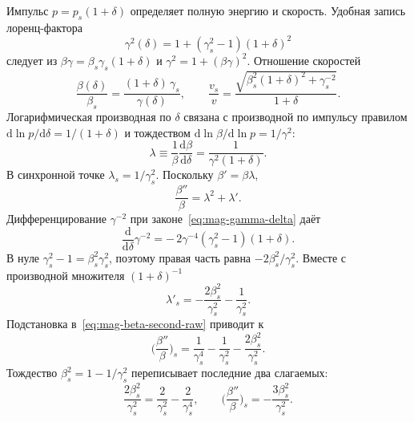 \documentclass[aps,pra,preprint,a4paper,amsmath,amssymb,longbibliography]{revtex4-2}
\begin{document}
Импульс $p=p_s(1+\delta)$ определяет полную энергию и скорость. Удобная запись лоренц-фактора
\begin{equation}
\label{eq:mag-gamma-delta}
\gamma^2(\delta)=1+(\gamma_s^2-1)(1+\delta)^2
\end{equation}
следует из $\beta\gamma=\beta_s\gamma_s(1+\delta)$ и $\gamma^2=1+(\beta\gamma)^2$. Отношение скоростей
\begin{equation}
\label{eq:mag-beta-exact}
\frac{\beta(\delta)}{\beta_s}
=\frac{(1+\delta)\,\gamma_s}{\gamma(\delta)},
\qquad
\frac{v_s}{v}
=\frac{\sqrt{\beta_s^2(1+\delta)^2+\gamma_s^{-2}}}{1+\delta}.
\end{equation}
Логарифмическая производная по $\delta$ связана с производной по импульсу правилом $\mathrm{d}\ln p/\mathrm{d}\delta=1/(1+\delta)$ и тождеством $\mathrm{d}\ln\beta/\mathrm{d}\ln p=1/\gamma^2$:
\begin{equation}
\label{eq:mag-lambda}
\lambda\equiv\frac{1}{\beta}\frac{\mathrm{d}\beta}{\mathrm{d}\delta}
=\frac{1}{\gamma^2(1+\delta)}.
\end{equation}
В синхронной точке $\lambda_s=1/\gamma_s^2$. Поскольку $\beta'=\beta\lambda$,
\begin{equation}
\label{eq:mag-beta-second-raw}
\frac{\beta''}{\beta}=\lambda^2+\lambda'.
\end{equation}
Дифференцирование $\gamma^{-2}$ при законе~\eqref{eq:mag-gamma-delta} даёт
\begin{equation}
\label{eq:mag-dgamma}
\frac{\mathrm{d}}{\mathrm{d}\delta}\gamma^{-2}
=-\,2\gamma^{-4}(\gamma_s^2-1)(1+\delta).
\end{equation}
В нуле $\gamma_s^2-1=\beta_s^2\gamma_s^2$, поэтому правая часть равна $-2\beta_s^2/\gamma_s^2$. Вместе с производной множителя $(1+\delta)^{-1}$
\begin{equation}
\label{eq:mag-lambda-prime}
\lambda'_s=-\frac{2\beta_s^2}{\gamma_s^2}-\frac{1}{\gamma_s^2}.
\end{equation}
Подстановка в~\eqref{eq:mag-beta-second-raw} приводит к
\begin{equation}
\label{eq:mag-beta-second-alg}
\Biggl(\frac{\beta''}{\beta}\Biggr)_s
=\frac{1}{\gamma_s^4}-\frac{1}{\gamma_s^2}-\frac{2\beta_s^2}{\gamma_s^2}.
\end{equation}
Тождество $\beta_s^2=1-1/\gamma_s^2$ переписывает последние два слагаемых:
\begin{equation}
\label{eq:mag-beta-second}
\frac{2\beta_s^2}{\gamma_s^2}=\frac{2}{\gamma_s^2}-\frac{2}{\gamma_s^4},
\qquad
\Biggl(\frac{\beta''}{\beta}\Biggr)_s
=-\frac{3\beta_s^2}{\gamma_s^2}.
\end{equation}
\end{document}
